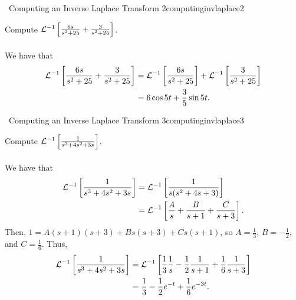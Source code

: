         \begin{example}{\Difficulty\,\Difficulty\,\,Computing an Inverse Laplace Transform 2}{computinginvlaplace2}

            Compute \(\laplace[-1]{\frac{6s}{s^2+25}+\frac{3}{s^2+25}}\).
            \\
            \\
            We have that
            \begin{align*}
                \laplace[-1]{\frac{6s}{s^2+25}+\frac{3}{s^2+25}}&=\laplace[-1]{\frac{6s}{s^2+25}}+\laplace[-1]{\frac{3}{s^2+25}} \\
                &=6\cos 5t+\frac{3}{5}\sin 5t.
            \end{align*}            
        \end{example}
        \pagebreak
        \begin{example}{\Difficulty\,\Difficulty\,\,Computing an Inverse Laplace Transform 3}{computinginvlaplace3}

            Compute \(\laplace[-1]{\frac{1}{s^3+4s^2+3s}}\).
            \\
            \\
            We have that
            \begin{align*}
                \laplace[-1]{\frac{1}{s^3+4s^2+3s}}&=\laplace[-1]{\frac{1}{s(s^2+4s+3)}} \\
                &=\laplace[-1]{\frac{A}{s}+\frac{B}{s+1}+\frac{C}{s+3}}.
            \end{align*}
            Then, \(1=A(s+1)(s+3)+Bs(s+3)+Cs(s+1)\), so \(A=\frac{1}{3}\), \(B=-\frac{1}{2}\), and \(C=\frac{1}{6}\). Thus,
            \begin{align*}
                \laplace[-1]{\frac{1}{s^3+4s^2+3s}}&=\laplace[-1]{\frac{1}{3}\frac{1}{s}-\frac{1}{2}\frac{1}{s+1}+\frac{1}{6}\frac{1}{s+3}} \\
                &=\frac{1}{3}-\frac{1}{2}e^{-t}+\frac{1}{6}e^{-3t}.
            \end{align*}
            
        \end{example}
